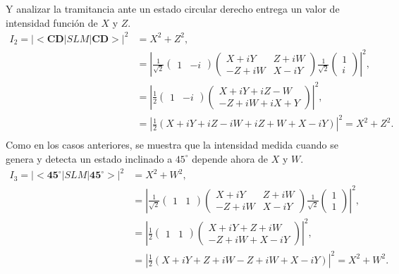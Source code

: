 Y analizar la tramitancia ante un estado circular derecho entrega un
valor de intensidad función de $X$ y $Z$.
\begin{align*}
I_2 = |<\mathbf{CD}|SLM|\mathbf{CD}>|^2 &= X^2+Z^2,\\
&=  \left|\frac{1}{\sqrt{2}}\begin{pmatrix} 1&-i\end{pmatrix} 
       \begin{pmatrix}
         X+iY & Z+iW \\-Z+iW & X-iY
       \end{pmatrix} \frac{1}{\sqrt{2}}\begin{pmatrix}1\\i\end{pmatrix}\right|^2 ,\\
&=  \left|\frac{1}{2}\begin{pmatrix} 1&-i\end{pmatrix} 
       \begin{pmatrix} X+iY +iZ-W\\-Z+iW +iX+Y\end{pmatrix} \right|^2 ,\\
&=  \left|\frac{1}{2}\left(X+iY+iZ-iW+iZ+W+X-iY\right)\right|^2 =  X^2+Z^2.\\
\end{align*}
Como en los casos anteriores, se muestra que la intensidad medida
cuando se genera y detecta un estado inclinado a $45^{\circ}$ depende
ahora de $X$ y $W$.
\begin{align*}
I_3 = |<\mathbf{45^{\circ}}|SLM|\mathbf{45^{\circ}}>|^2 &= X^2+W^2,\\
&=  \left|\frac{1}{\sqrt{2}}\begin{pmatrix} 1&1\end{pmatrix} 
       \begin{pmatrix}
         X+iY & Z+iW \\-Z+iW & X-iY
       \end{pmatrix} \frac{1}{\sqrt{2}}\begin{pmatrix}1\\1\end{pmatrix}\right|^2 ,\\
&=  \left|\frac{1}{2}\begin{pmatrix} 1&1\end{pmatrix} 
       \begin{pmatrix} X+iY +Z+iW\\-Z+iW +X-iY\end{pmatrix} \right|^2, \\
&=  \left|\frac{1}{2}\left(X+iY+Z+iW-Z+iW+X-iY\right)\right|^2 =  X^2+W^2.\\
\end{align*}

